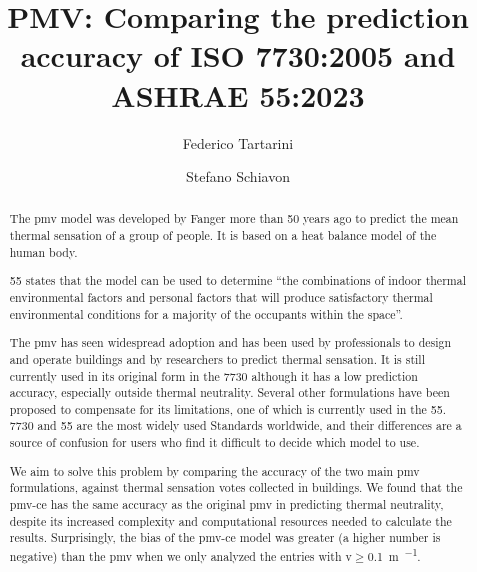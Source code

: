 \begin{frontmatter}

    \title{PMV: Comparing the prediction accuracy of ISO 7730:2005 and ASHRAE 55:2023}

    \author[label1,label2]{Federico Tartarini}
    \author[label3]{Stefano Schiavon}

    \address[label1]{Berkeley Education Alliance for Research in Singapore, Singapore}
    \address[label2]{Heat and Health Research Incubator, Faculty of Health and Medicine, University of Sydney, Sydney, AU}
    \address[label3]{Center for the Built Environment, University of California, Berkeley, CA, USA}


    \begin{abstract}
        The \ac{pmv} model was developed by Fanger more than 50 years ago to predict the mean thermal sensation of a group of people. 
        It is based on a heat balance model of the human body.

        \gls{55} states that the model can be used to determine ``the combinations of indoor thermal environmental factors and personal factors that will produce satisfactory thermal environmental conditions for a majority of the occupants within the space''.

        The \ac{pmv} has seen widespread adoption and has been used by professionals to design and operate buildings and by researchers to predict thermal sensation.
        It is still currently used in its original form in the \gls{7730} although it has a low prediction accuracy, especially outside thermal neutrality.
        Several other formulations have been proposed to compensate for its limitations, one of which is currently used in the \gls{55}.
        \gls{7730} and \gls{55} are the most widely used Standards worldwide, and their differences are a source of confusion for users who find it difficult to decide which model to use.

        We aim to solve this problem by comparing the accuracy of the two main \ac{pmv} formulations, against  thermal sensation votes collected in buildings.
        We found that the \ac{pmv-ce} has the same accuracy as the original \ac{pmv} in predicting thermal neutrality, despite its increased complexity and computational resources needed to calculate the results.
        Surprisingly, the bias of the \ac{pmv-ce} model was greater (a higher number is negative) than the \ac{pmv} when we only analyzed the entries with \ac{v}$\geq$\qty{0.1}{\m\per\sec}.


\end{abstract}
\end{frontmatter}
